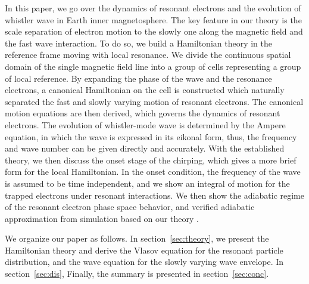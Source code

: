 In this paper, we go over the dynamics of resonant electrons and the evolution of whistler wave in Earth inner magnetosphere.
The key feature in our theory is the scale separation of electron motion to the slowly one along the magnetic field and the fast wave interaction. 
To do so, we build a Hamiltonian theory in the reference frame moving with local resonance.
We divide the continuous spatial domain of the single magnetic field line into a group of cells representing a group of local reference.
By expanding the phase of the wave and the resonance electrons, a canonical Hamiltonian on the cell is constructed which naturally separated the fast and slowly varying motion of resonant electrons.
The canonical motion equations are then derived, which governs the dynamics of resonant electrons. 
The evolution of whistler-mode wave is determined by the Ampere equation, in which the wave is expressed in its eikonal form, thus, the frequency and wave number can be given directly and accurately.
With the established theory, we then discuss the onset stage of the chirping, which gives a more brief form for the local Hamiltonian. 
In the onset condition, the frequency of the wave is assumed to be time independent, and we show an integral of motion for the trapped electrons under resonant interactions.
We then show the adiabatic regime of the resonant electron phase space behavior, and verified adiabatic approximation from simulation based on our theory \cite{zheng2023b}.


We organize our paper as follows. In section~\ref{sec:theory}, we present the Hamiltonian theory and derive the Vlasov equation for the resonant particle distribution, and the wave equation for the slowly varying wave envelope.
In section~\ref{sec:dis}, 
Finally, the summary is presented in section~\ref{sec:conc}.
